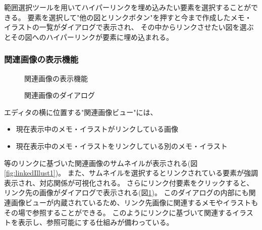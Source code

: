 範囲選択ツールを用いてハイパーリンクを埋め込みたい要素を選択することができる。
要素を選択して"他の図とリンクボタン"を押すと今まで作成したメモ・イラストの一覧がダイアログで表示され、
その中からリンクさせたい図を選ぶとその図へのハイパーリンクが要素に埋め込まれる。

\subsubsection{関連画像の表示機能}

\begin{figure}[htbp] \begin{minipage}{0.5\hsize}
                         \begin{center} 
                         \end{center} \caption{関連画像の表示機能} \label{fig:linkedIllust1}
\end{minipage} \begin{minipage}{0.5\hsize}
                   \begin{center} 
                   \end{center} \caption{関連画像のダイアログ} \label{fig:linkedIllust2}
\end{minipage}
\end{figure}

エディタの横に位置する"関連画像ビュー"には、
\begin{itemize}
    \item 現在表示中のメモ・イラストがリンクしている画像
    \item 現在表示中のメモ・イラストをリンクしている別のメモ・イラスト
\end{itemize}等のリンクに基づいた関連画像のサムネイルが表示される(図\ref{fig:linkedIllust1})。
また、サムネイルを選択するとリンクされている要素が強調表示され、対応関係が可視化される。
さらにリンク付要素をクリックすると、リンク先の画像がダイアログで表示される(図\ref{fig:linkedIllust2})。
このダイアログの内部にも関連画像ビューが内蔵されているため、リンク先画像に関連するメモやイラストもその場で参照することができる。
このようにリンクに基づいて関連するイラストを表示し、参照可能にする仕組みが備わっている。

